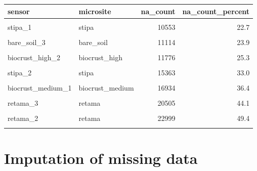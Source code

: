 \documentclass[]{article}
\begin{document}
\begin{table}[H]
\centering
\begin{tabular}[t]{l|l|r|r}
\hline
sensor & microsite & na\_count & na\_count\_percent\\
\hline
\cellcolor{gray!6}{biocrust\_high\_1} & \cellcolor{gray!6}{biocrust\_high} & \cellcolor{gray!6}{7674} & \cellcolor{gray!6}{16.5}\\
\hline
stipa\_1 & stipa & 10553 & 22.7\\
\hline
\cellcolor{gray!6}{bare\_soil\_1} & \cellcolor{gray!6}{bare\_soil} & \cellcolor{gray!6}{10987} & \cellcolor{gray!6}{23.6}\\
\hline
bare\_soil\_3 & bare\_soil & 11114 & 23.9\\
\hline
\cellcolor{gray!6}{bare\_soil\_2} & \cellcolor{gray!6}{bare\_soil} & \cellcolor{gray!6}{11188} & \cellcolor{gray!6}{24.1}\\
\hline
biocrust\_high\_2 & biocrust\_high & 11776 & 25.3\\
\hline
\cellcolor{gray!6}{biocrust\_high\_3} & \cellcolor{gray!6}{biocrust\_high} & \cellcolor{gray!6}{14125} & \cellcolor{gray!6}{30.4}\\
\hline
stipa\_2 & stipa & 15363 & 33.0\\
\hline
\cellcolor{gray!6}{stipa\_3} & \cellcolor{gray!6}{stipa} & \cellcolor{gray!6}{15604} & \cellcolor{gray!6}{33.5}\\
\hline
biocrust\_medium\_1 & biocrust\_medium & 16934 & 36.4\\
\hline
\cellcolor{gray!6}{biocrust\_medium\_2} & \cellcolor{gray!6}{biocrust\_medium} & \cellcolor{gray!6}{18743} & \cellcolor{gray!6}{40.3}\\
\hline
retama\_3 & retama & 20505 & 44.1\\
\hline
\cellcolor{gray!6}{retama\_1} & \cellcolor{gray!6}{retama} & \cellcolor{gray!6}{22840} & \cellcolor{gray!6}{49.1}\\
\hline
retama\_2 & retama & 22999 & 49.4\\
\hline
\cellcolor{gray!6}{biocrust\_medium\_3} & \cellcolor{gray!6}{biocrust\_medium} & \cellcolor{gray!6}{31225} & \cellcolor{gray!6}{67.1}\\
\hline
\end{tabular}
\end{table}

\hypertarget{imputation-of-missing-data}{%
\section{Imputation of missing data}\label{imputation-of-missing-data}}
\end{document}
